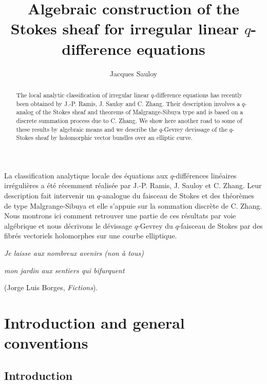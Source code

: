 \documentclass[english]{smfart}
\author[J. Sauloy]{Jacques Sauloy}
\title[Algebraic construction of the Stokes sheaf
for irregular $q$-difference
equations]{Algebraic construction of the  Stokes sheaf
for irregular linear \protect\boldmath$q$\protect\unboldmath-difference
equations}
\numberwithin{equation}{thm}
\begin{document}
\frontmatter


\begin{altabstract}
   La classification analytique locale
des \'equations aux $q$-diff\'erences lin\'eaires irr\'eguli\`eres
a \'et\'e r\'ecemment r\'ealis\'ee par J.-P. Ramis, J. Sauloy et
C. Zhang. Leur description fait intervenir un $q$-analogue du
faisceau de Stokes
et des th\'eor\`emes de type Malgrange-Sibuya et elle s'appuie
sur la sommation discr\`ete de C. Zhang. Nous montrons ici
comment retrouver une partie de ces r\'esultats par voie
alg\'ebrique et nous d\'ecrivons le 
d\'evissage $q$-Gevrey du $q$-faisceau de Stokes par des fibr\'es
vectoriels holomorphes sur une courbe elliptique.
\end{altabstract}


\begin{abstract}
   The local analytic classification of
irregular linear $q$-difference equations has recently been obtained
by J.-P. Ramis, J. Sauloy and C. Zhang. Their description involves
a $q$-analog of the Stokes sheaf and theorems of Malgrange-Sibuya type and is
based on a discrete summation process due to C. Zhang. We show here
another road to some of these results by algebraic means and we
describe the $q$-Gevrey devissage of the
$q$-Stokes sheaf by holomorphic vector bundles over an elliptic
curve.
\end{abstract}



\maketitle


\hfill{\it Je laisse aux nombreux avenirs (non \`a tous) }

\hfill{\it mon jardin aux sentiers qui bifurquent}

\hfill(Jorge Luis Borges, {\it Fictions}).


\tableofcontents

\mainmatter



\section{Introduction and general conventions}


\subsection{Introduction}
\end{document}
